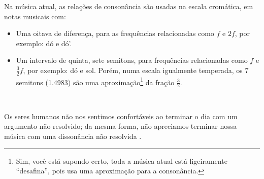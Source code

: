 Na música atual, as relações de consonância são usadas na escala cromática, 
em notas musicais com:
\begin{itemize} 
\item Uma oitava de diferença, para as frequências relacionadas como $f$ e $2f$, 
por exemplo: dó e dó'.
\item Um intervalo de quinta, sete semitons, para frequências relacionadas como  $f$ e $\frac{3}{2}f$, 
por exemplo: dó e sol. Porém, numa escala igualmente temperada, 
os 7 semitons (1.4983) são uma aproximação\footnote{Sim, você está supondo certo,
toda a música atual está ligeiramente ``desafina'', pois usa uma aproximação para a consonância.}
 da fração $\frac{3}{2}$.
\end{itemize}~


Os seres humanos não nos sentimos confortáveis ao terminar o dia com um argumento não resolvido; 
da mesma forma, não apreciamos terminar nossa música com uma dissonância não resolvida \cite[pp. 26]{wright2012essential}.

